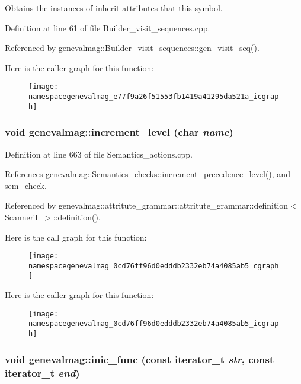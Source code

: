 Obtains the instances of inherit attributes that this symbol. 

Definition at line 61 of file Builder\_\-visit\_\-sequences.cpp.

Referenced by genevalmag::Builder\_\-visit\_\-sequences::gen\_\-visit\_\-seq().

Here is the caller graph for this function:\nopagebreak
\begin{figure}[H]
\begin{center}
\leavevmode
\texttt{[image: namespacegenevalmag\_e77f9a26f51553fb1419a41295da521a\_icgraph]}
\end{center}
\end{figure}
\hypertarget{namespacegenevalmag_0cd76ff96d0edddb2332eb74a4085ab5}{
\subsubsection[{increment\_\-level}]{\setlength{\rightskip}{0pt plus 5cm}void genevalmag::increment\_\-level (char {\em name})}}
\label{namespacegenevalmag_0cd76ff96d0edddb2332eb74a4085ab5}




Definition at line 663 of file Semantics\_\-actions.cpp.

References genevalmag::Semantics\_\-checks::increment\_\-precedence\_\-level(), and sem\_\-check.

Referenced by genevalmag::attritute\_\-grammar::attritute\_\-grammar::definition$<$ ScannerT $>$::definition().

Here is the call graph for this function:\nopagebreak
\begin{figure}[H]
\begin{center}
\leavevmode
\texttt{[image: namespacegenevalmag\_0cd76ff96d0edddb2332eb74a4085ab5\_cgraph]}
\end{center}
\end{figure}


Here is the caller graph for this function:\nopagebreak
\begin{figure}[H]
\begin{center}
\leavevmode
\texttt{[image: namespacegenevalmag\_0cd76ff96d0edddb2332eb74a4085ab5\_icgraph]}
\end{center}
\end{figure}
\hypertarget{namespacegenevalmag_815257dc75d0f8a85662cdfc618c2187}{
\subsubsection[{inic\_\-func}]{\setlength{\rightskip}{0pt plus 5cm}void genevalmag::inic\_\-func (const iterator\_\-t {\em str}, \/  const iterator\_\-t {\em end})}}
\label{namespacegenevalmag_815257dc75d0f8a85662cdfc618c2187}


